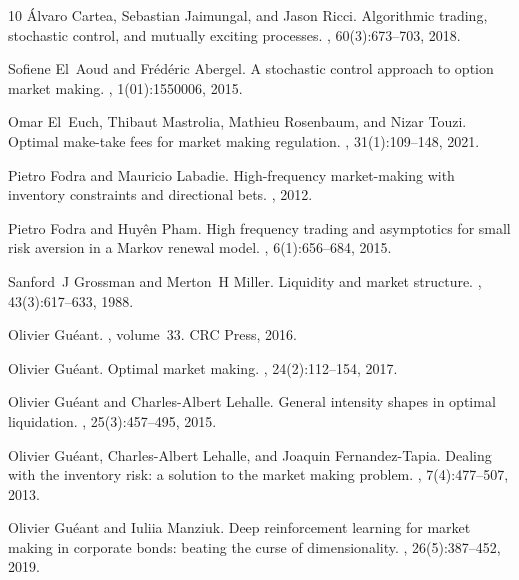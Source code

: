 \documentclass[preprint, 3p]{elsarticle}
\newcommand{\1}{{\chi}}
\begin{document}
\begin{thebibliography}{10}
{\'A}lvaro Cartea, Sebastian Jaimungal, and Jason Ricci.
\newblock Algorithmic trading, stochastic control, and mutually exciting
  processes.
, 60(3):673--703, 2018.

Sofiene El~Aoud and Fr{\'e}d{\'e}ric Abergel.
\newblock A stochastic control approach to option market making.
, 1(01):1550006, 2015.

Omar El~Euch, Thibaut Mastrolia, Mathieu Rosenbaum, and Nizar Touzi.
\newblock Optimal make-take fees for market making regulation.
, 31(1):109--148, 2021.

Pietro Fodra and Mauricio Labadie.
\newblock High-frequency market-making with inventory constraints and
  directional bets.
, 2012.

Pietro Fodra and Huy{\^e}n Pham.
\newblock High frequency trading and asymptotics for small risk aversion in a
  Markov renewal model.
, 6(1):656--684, 2015.

Sanford~J Grossman and Merton~H Miller.
\newblock Liquidity and market structure.
, 43(3):617--633, 1988.

Olivier Gu{\'e}ant.
, volume~33.
\newblock CRC Press, 2016.

Olivier Gu{\'e}ant.
\newblock Optimal market making.
, 24(2):112--154, 2017.

Olivier Gu{\'e}ant and Charles-Albert Lehalle.
\newblock General intensity shapes in optimal liquidation.
, 25(3):457--495, 2015.

Olivier Gu{\'e}ant, Charles-Albert Lehalle, and Joaquin Fernandez-Tapia.
\newblock Dealing with the inventory risk: a solution to the market making
  problem.
, 7(4):477--507, 2013.

Olivier Gu{\'e}ant and Iuliia Manziuk.
\newblock Deep reinforcement learning for market making in corporate bonds:
  beating the curse of dimensionality.
, 26(5):387--452, 2019.


\end{thebibliography}
\end{document}
